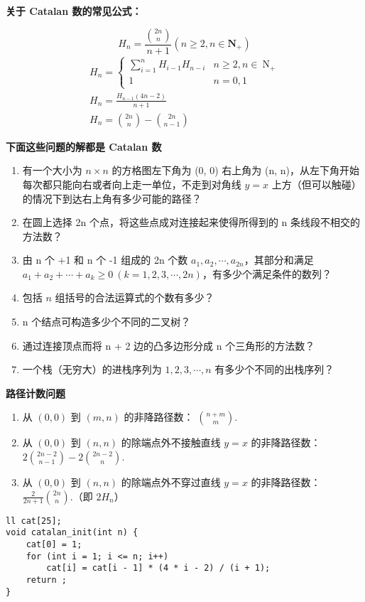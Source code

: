 \documentclass[UTF8]{article}
\begin{document}
\noindent \textbf{关于 Catalan 数的常见公式：}

$$
H_n=\frac{\binom{2 n}{n}}{n+1}\left(n \geq 2, n \in \mathbf{N}_{+}\right)
$$
$$
\begin{gathered}
H_n= \begin{cases}\sum_{i=1}^n H_{i-1} H_{n-i} & n \geq 2, n \in \mathrm{~N}_{+} \\
1 & n=0,1\end{cases} \\
H_n=\frac{H_{n-1}(4 n-2)}{n+1} \\
H_n=\binom{2 n}{n}-\binom{2 n}{n-1}
\end{gathered}
$$

\noindent \textbf{下面这些问题的解都是 Catalan 数}
\begin{enumerate}
	\item 有一个大小为 $n\times n$ 的方格图左下角为 (0, 0) 右上角为 (n, n)，从左下角开始每次都只能向右或者向上走一单位，不走到对角线 $y=x$ 上方（但可以触碰）的情况下到达右上角有多少可能的路径？
	\item 在圆上选择 2n 个点，将这些点成对连接起来使得所得到的 n 条线段不相交的方法数？
	\item 由 n 个 +1 和 n 个 -1 组成的 2n 个数 $a_1,a_2, \cdots ,a_{2n}$，其部分和满足 $a_1+a_2+ \cdots +a_k \geq 0~(k=1,2,3, \cdots ,2n)$，有多少个满足条件的数列？
	\item 包括 $n$ 组括号的合法运算式的个数有多少？
	\item n 个结点可构造多少个不同的二叉树？
	\item 通过连接顶点而将 n + 2 边的凸多边形分成 n 个三角形的方法数？
	\item 一个栈（无穷大）的进栈序列为 $1,2,3, \cdots ,n$ 有多少个不同的出栈序列？
\end{enumerate}

\noindent \textbf{路径计数问题}
\begin{enumerate}
	\item 从 $(0,0)$ 到 $(m,n)$ 的非降路径数： $\binom{n + m}{m}$.
	\item 从 $(0,0)$ 到 $(n,n)$ 的除端点外不接触直线 $y = x$ 的非降路径数：$2 \binom{2n - 2}{n - 1} - 2 \binom{2n - 2}{n}$.
	\item 从 $(0,0)$ 到 $(n,n)$ 的除端点外不穿过直线 $y = x$ 的非降路径数：$\frac{2}{2n + 1} \binom{2n}{n}$.（即 $2H_n$）
\end{enumerate}

\begin{lstlisting}[caption=卡特兰数]
ll cat[25];
void catalan_init(int n) {
    cat[0] = 1;
    for (int i = 1; i <= n; i++)
        cat[i] = cat[i - 1] * (4 * i - 2) / (i + 1);
    return ;
}
\end{lstlisting}
\end{document}
